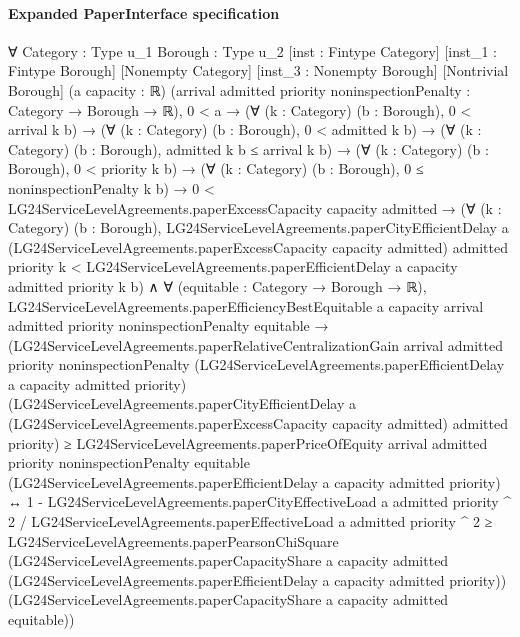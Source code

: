 \documentclass[10pt]{article}
\begin{document}
\paragraph{Expanded PaperInterface specification}
\begin{ReviewVerbatim}
∀ {Category : Type u_1} {Borough : Type u_2} [inst : Fintype Category] [inst_1 : Fintype Borough] [Nonempty Category]
  [inst_3 : Nonempty Borough] [Nontrivial Borough] (a capacity : ℝ)
  (arrival admitted priority noninspectionPenalty : Category → Borough → ℝ),
  0 < a →
    (∀ (k : Category) (b : Borough), 0 < arrival k b) →
      (∀ (k : Category) (b : Borough), 0 < admitted k b) →
        (∀ (k : Category) (b : Borough), admitted k b ≤ arrival k b) →
          (∀ (k : Category) (b : Borough), 0 < priority k b) →
            (∀ (k : Category) (b : Borough), 0 ≤ noninspectionPenalty k b) →
              0 < LG24ServiceLevelAgreements.paperExcessCapacity capacity admitted →
                (∀ (k : Category) (b : Borough),
                    LG24ServiceLevelAgreements.paperCityEfficientDelay a
                        (LG24ServiceLevelAgreements.paperExcessCapacity capacity admitted) admitted priority k <
                      LG24ServiceLevelAgreements.paperEfficientDelay a capacity admitted priority k b) ∧
                  ∀ (equitable : Category → Borough → ℝ),
                    LG24ServiceLevelAgreements.paperEfficiencyBestEquitable a capacity arrival admitted priority
                        noninspectionPenalty equitable →
                      (LG24ServiceLevelAgreements.paperRelativeCentralizationGain arrival admitted priority
                            noninspectionPenalty
                            (LG24ServiceLevelAgreements.paperEfficientDelay a capacity admitted priority)
                            (LG24ServiceLevelAgreements.paperCityEfficientDelay a
                              (LG24ServiceLevelAgreements.paperExcessCapacity capacity admitted) admitted priority) ≥
                          LG24ServiceLevelAgreements.paperPriceOfEquity arrival admitted priority noninspectionPenalty
                            equitable (LG24ServiceLevelAgreements.paperEfficientDelay a capacity admitted priority) ↔
                        1 -
                            LG24ServiceLevelAgreements.paperCityEffectiveLoad a admitted priority ^ 2 /
                              LG24ServiceLevelAgreements.paperEffectiveLoad a admitted priority ^ 2 ≥
                          LG24ServiceLevelAgreements.paperPearsonChiSquare
                            (LG24ServiceLevelAgreements.paperCapacityShare a capacity admitted
                              (LG24ServiceLevelAgreements.paperEfficientDelay a capacity admitted priority))
                            (LG24ServiceLevelAgreements.paperCapacityShare a capacity admitted equitable))
\end{ReviewVerbatim}
\end{document}
